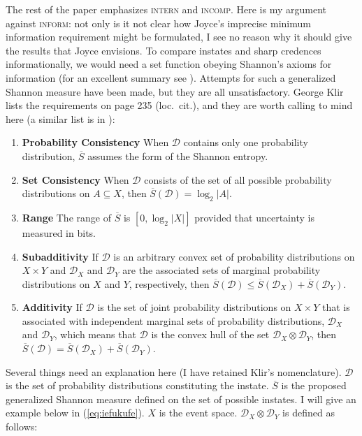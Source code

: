 The rest of the paper emphasizes \textsc{intern} and
\textsc{incomp}. Here is my argument against \textsc{inform}: not only
is it not clear how Joyce's imprecise minimum information requirement
might be formulated, I see no reason why it should give the results
that Joyce envisions. To compare instates and sharp credences
informationally, we would need a set function obeying Shannon's axioms
for information (for an excellent summary see ).
Attempts for such a generalized Shannon measure have been made, but
they are all unsatisfactory. George Klir lists the requirements on
page 235 (loc.\ cit.), and they are worth calling to mind here (a
similar list is in ):

\begin{enumerate}[(S1)]
\item \textbf{Probability Consistency} When $\mathcal{D}$ contains
  only one probability distribution, $\overline{S}$ assumes the form of
  the Shannon entropy.
\item \textbf{Set Consistency} When $\mathcal{D}$ consists of the set
  of all possible probability distributions on $A\subseteq{}X$, then
  $\overline{S}(\mathcal{D})=\log_{2}|A|$.
\item \textbf{Range} The range of $\overline{S}$ is $[0,\log_{2}|X|]$
  provided that uncertainty is measured in bits.
\item \textbf{Subadditivity} If $\mathcal{D}$ is an arbitrary convex
  set of probability distributions on $X\times{}Y$ and
  $\mathcal{D}_{X}$ and $\mathcal{D}_{Y}$ are the associated sets of
  marginal probability distributions on $X$ and $Y$, respectively,
  then
  $\overline{S}(\mathcal{D})\leq\overline{S}(\mathcal{D}_{X})+\overline{S}(\mathcal{D}_{Y})$.
\item \textbf{Additivity} If $\mathcal{D}$ is the set of joint
  probability distributions on $X\times{}Y$ that is associated with
  independent marginal sets of probability distributions,
  $\mathcal{D}_{X}$ and $\mathcal{D}_{Y}$, which means that
  $\mathcal{D}$ is the convex hull of the set
  $\mathcal{D}_{X}\otimes\mathcal{D}_{Y}$, then
  $\overline{S}(\mathcal{D})=\overline{S}(\mathcal{D}_{X})+\overline{S}(\mathcal{D}_{Y})$.
\end{enumerate}

Several things need an explanation here (I have retained Klir's
nomenclature). $\mathcal{D}$ is the set of probability distributions
constituting the instate. $\overline{S}$ is the proposed generalized
Shannon measure defined on the set of possible instates. I will give
an example below in (\ref{eq:iefukufe}). $X$ is the event space.
$\mathcal{D}_{X}\otimes\mathcal{D}_{Y}$ is defined as follows:

